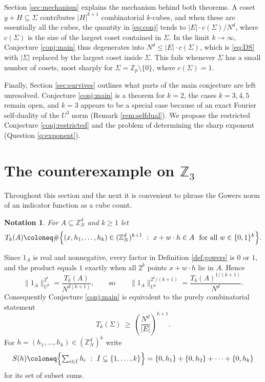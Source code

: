 \documentclass[12pt]{amsart}
\newcommand{\Z}{\mathbb{Z}}
\newtheorem{notation}[theorem]{Notation}
\begin{document}
Section \ref{sec:mechanism} explains the mechanism behind both theorems. A coset $y+H\subseteq\Sigma$ contributes $|H|^{k+1}$ combinatorial $k$-cubes, and when these are essentially all the cubes, the quantity in \eqref{eq:conj} tends to $|E|\cdot c(\Sigma)/N^d$, where $c(\Sigma)$ is the size of the largest coset contained in $\Sigma$. In the limit $k\to\infty$, Conjecture \ref{conj:main} thus degenerates into $N^d\le|E|\cdot c(\Sigma)$,
which is \eqref{eq:DS} with $|\Sigma|$ replaced by the largest coset inside $\Sigma$. This fails whenever $\Sigma$ has a small number of cosets, most sharply for $\Sigma=\Z_p\setminus\{0\}$, where $c(\Sigma)=1$.

Finally, Section \ref{sec:survives} outlines what parts of the main conjecture are left unresolved. Conjecture \ref{conj:main} is a theorem for $k=2$, the cases $k=3,4,5$ remain open, and $k=3$ appears to be a special case because of an exact Fourier self-duality of the $U^3$ norm (Remark \ref{rem:selfdual}). We propose the restricted Conjecture \ref{conj:restricted} and the problem of determining the sharp exponent (Question \ref{q:exponent}).

\section{The counterexample on $\Z_3$}\label{sec:Z3}

Throughout this section and the next it is convenient to phrase the Gowers norm of an indicator function as a cube count.

\begin{notation}\label{not:cubes}
For $A\subseteq\Z_N^d$ and $k\ge1$ let
\[
T_k(A)\coloneq\#\Bigl\{(x,h_1,\dots,h_k)\in(\Z_N^d)^{k+1}\ :\ x+w\cdot h\in A\ \text{ for all } w\in\{0,1\}^k\Bigr\}.
\]
\end{notation}

Since $1_A$ is real and nonnegative, every factor in Definition \ref{def:gowers} is $0$ or $1$, and the product equals $1$ exactly when all $2^k$ points $x+w\cdot h$ lie in $A$. Hence
\begin{equation}\label{eq:cubecount}
\|1_A\|_{U^k}^{2^k}=\frac{T_k(A)}{N^{d(k+1)}},
\qquad\text{so}\qquad
\|1_A\|_{U^k}^{2^k/(k+1)}=\frac{T_k(A)^{1/(k+1)}}{N^{d}} .
\end{equation}
Consequently Conjecture \ref{conj:main} is equivalent to the purely combinatorial statement
\begin{equation}\label{eq:conjcubes}
T_k(\Sigma)\ \ge\ \left(\frac{N^d}{|E|}\right)^{k+1}.
\end{equation}
For $h=(h_1,\dots,h_k)\in(\Z_N^d)^k$ write
\[
S(h)\coloneq\Bigl\{\textstyle\sum_{i\in I}h_i\ :\ I\subseteq\{1,\dots,k\}\Bigr\}
=\{0,h_1\}+\{0,h_2\}+\cdots+\{0,h_k\}
\]
for its set of subset sums.
\end{document}
